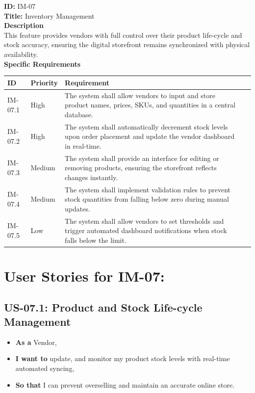 \textbf{ID:} IM-07\\
\textbf{Title:} Inventory Management\\
\textbf{Description}\\
This feature provides vendors with full control over their product life-cycle and stock accuracy, ensuring the digital storefront remains synchronized with physical availability.\\
\textbf{Specific Requirements}

\begin{table}[H]
\centering
\label{tab:vendor-requirements}
\begin{tabular}{>{\raggedright\arraybackslash}p{2cm}>{\raggedright\arraybackslash}p{3cm}>{\raggedright\arraybackslash}p{7cm}>{\centering\arraybackslash}p{2cm}}
\toprule
\textbf{ID} & \textbf{Priority} & \textbf{Requirement} \\
\midrule
IM-07.1 & High & The system shall allow vendors to input and store product names, prices, SKUs, and quantities in a central database.\\
\midrule
IM-07.2 & High & The system shall automatically decrement stock levels upon order placement and update the vendor dashboard in real-time.\\
\midrule
IM-07.3 & Medium & The system shall provide an interface for editing or removing products, ensuring the storefront reflects changes instantly.  \\
\midrule
IM-07.4 & Medium & The system shall implement validation rules to prevent stock quantities from falling below zero during manual updates. \\
\midrule
IM-07.5 & Low & The system shall allow vendors to set thresholds and trigger automated dashboard notifications when stock falls below the limit. \\
\bottomrule
\end{tabular}
\end{table}

\section*{User Stories for IM-07: }

\subsection*{US-07.1: Product and Stock Life-cycle Management}
\begin{itemize}
    \item \textbf{As a} Vendor,
    \item \textbf{I want to} update, and monitor my product stock levels with real-time automated syncing,
    \item \textbf{So that} I can prevent overselling and maintain an accurate online store.
\end{itemize}

